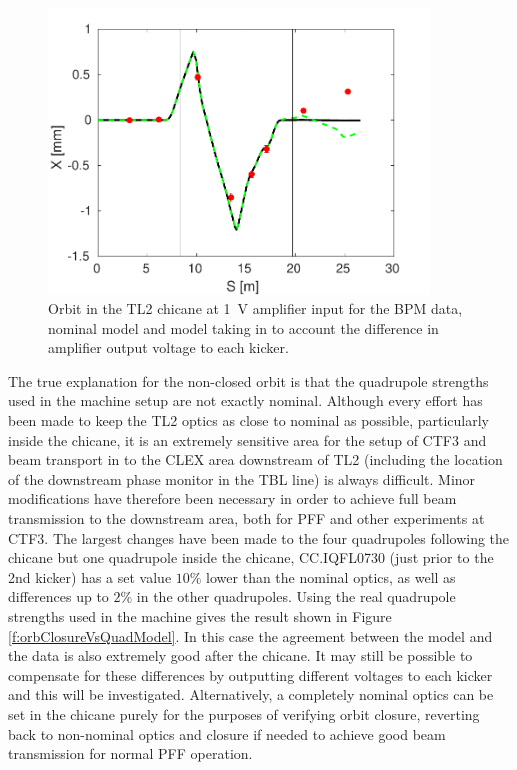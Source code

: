 \begin{figure}
  \centering
  \includegraphics[width=0.9\textwidth]{Figures/commissioning/orbClosureVsAmpModel}
  \caption{Orbit in the TL2 chicane at 1~V amplifier input for the BPM data, nominal model and model taking in to account the difference in amplifier output voltage to each kicker.}
  \label{f:orbClosureVsAmpModel}
\end{figure}

The true explanation for the non-closed orbit is that the quadrupole strengths used in the machine setup are not exactly nominal. Although every effort has been made to keep the TL2 optics as close to nominal as possible, particularly inside the chicane, it is an extremely sensitive area for the setup of CTF3 and beam transport in to the CLEX area downstream of TL2 (including the location of the downstream phase monitor in the TBL line) is always difficult. Minor modifications have therefore been necessary in order to achieve full beam transmission to the downstream area, both for PFF and other experiments at CTF3. The largest changes have been made to the four quadrupoles following the chicane but one quadrupole inside the chicane, CC.IQFL0730 (just prior to the 2nd kicker) has a set value \(10\%\) lower than the nominal optics, as well as differences up to \(2\%\) in the other quadrupoles. Using the real quadrupole strengths used in the machine gives the result shown in Figure \ref{f:orbClosureVsQuadModel}. In this case the agreement between the model and the data is also extremely good after the chicane. It may still be possible to compensate for these differences by outputting different voltages to each kicker and this will be investigated. Alternatively, a completely nominal optics can be set in the chicane purely for the purposes of verifying orbit closure, reverting back to non-nominal optics and closure if needed to achieve good beam transmission for normal PFF operation.

